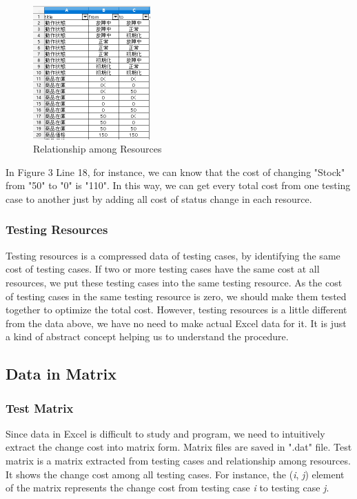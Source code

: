 \documentclass[12pt,a4paper]{article}
\begin{document}
\begin{figure}[H]
\centering
\includegraphics[width=0.4\textwidth]{resources_relation.PNG}
\caption{Relationship among Resources}
\end{figure}

In Figure 3 Line 18, for instance, we can know that the cost of changing "Stock" from "50" to "0" is "110". In this way, we can get every total cost from one testing case to another just by adding all cost of status change in each resource.

\subsubsection{Testing Resources}

Testing resources is a compressed data of testing cases, by identifying the same cost of testing cases. If two or more testing cases have the same cost at all resources, we put these testing cases into the same testing resource. As the cost of testing cases in the same testing resource is zero, we should make them tested together to optimize the total cost. However, testing resources is a little different from the data above, we have no need to make actual Excel data for it. It is just a kind of abstract concept helping us to understand the procedure.

\subsection{Data in Matrix}

\subsubsection{Test Matrix}

Since data in Excel is difficult to study and program, we need to intuitively extract the change cost into matrix form. Matrix files are saved in ".dat" file. Test matrix is a matrix extracted from testing cases and relationship among resources. It shows the change cost among all testing cases. For instance, the (\emph{i}, \emph{j}) element of the matrix represents the change cost from testing case \emph{i} to testing case \emph{j}. 
\end{document}
